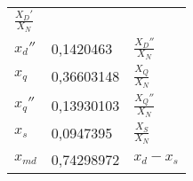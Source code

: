 \begin{longtable}[]{@{}lll@{}}
\begin{minipage}[t]{0.55\columnwidth}
\(\frac{X_D'}{X_N}\)\strut
\end{minipage}\tabularnewline
\begin{minipage}[t]{0.10\columnwidth}\raggedright
\(x_d''\)\strut
\end{minipage} & \begin{minipage}[t]{0.25\columnwidth}\raggedright
0,1420463\strut
\end{minipage} & \begin{minipage}[t]{0.55\columnwidth}\raggedright
\(\frac{X_D''}{X_N}\)\strut
\end{minipage}\tabularnewline
\begin{minipage}[t]{0.10\columnwidth}\raggedright
\(x_q\)\strut
\end{minipage} & \begin{minipage}[t]{0.25\columnwidth}\raggedright
0,36603148\strut
\end{minipage} & \begin{minipage}[t]{0.55\columnwidth}\raggedright
\(\frac{X_Q}{X_N}\)\strut
\end{minipage}\tabularnewline
\begin{minipage}[t]{0.10\columnwidth}\raggedright
\(x_q''\)\strut
\end{minipage} & \begin{minipage}[t]{0.25\columnwidth}\raggedright
0,13930103\strut
\end{minipage} & \begin{minipage}[t]{0.55\columnwidth}\raggedright
\(\frac{X_Q''}{X_N}\)\strut
\end{minipage}\tabularnewline
\begin{minipage}[t]{0.10\columnwidth}\raggedright
\(x_s\)\strut
\end{minipage} & \begin{minipage}[t]{0.25\columnwidth}\raggedright
0,0947395\strut
\end{minipage} & \begin{minipage}[t]{0.55\columnwidth}\raggedright
\(\frac{X_S}{X_N}\)\strut
\end{minipage}\tabularnewline
\begin{minipage}[t]{0.10\columnwidth}\raggedright
\(x_{md}\)\strut
\end{minipage} & \begin{minipage}[t]{0.25\columnwidth}\raggedright
0,74298972\strut
\end{minipage} & \begin{minipage}[t]{0.55\columnwidth}\raggedright
\(x_d-x_s\)\strut
\end{minipage}\tabularnewline

\end{longtable}
